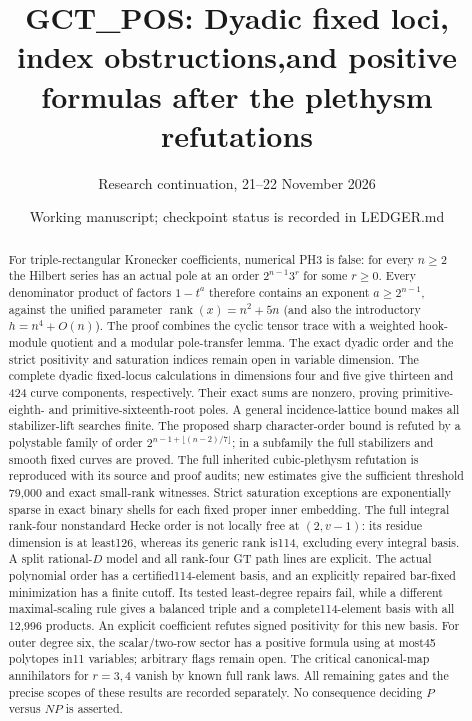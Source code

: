 \documentclass[11pt]{article}
\title{GCT\_POS: Dyadic fixed loci, index obstructions,\newline and positive formulas after the plethysm refutations}
\author{Research continuation, 21--22 November 2026}
\date{Working manuscript; checkpoint status is recorded in LEDGER.md}
\theoremstyle{definition}\newtheorem{definition}[theorem]{Definition}
\theoremstyle{remark}\newtheorem{remark}[theorem]{Remark}
\begin{document}
\maketitle
\begin{abstract}
For triple-rectangular Kronecker coefficients, numerical PH3 is false:
for every $n\ge2$ the Hilbert series has an actual pole at an order
$2^{n-1}3^r$ for some $r\ge0$. Every denominator product of factors
$1-t^a$ therefore contains an exponent $a\ge2^{n-1}$, against the
unified parameter $\operatorname{rank}(x)=n^2+5n$ (and also the introductory $h=n^4+O(n)$). The proof combines the cyclic tensor
trace with a weighted hook-module quotient and a modular pole-transfer
lemma. The exact dyadic order and the strict positivity and saturation
indices remain open in variable dimension. The complete dyadic
fixed-locus calculations in dimensions four and five give thirteen
and 424 curve components, respectively. Their exact sums are nonzero,
proving primitive-eighth- and primitive-sixteenth-root poles.
A general incidence-lattice bound makes all stabilizer-lift searches
finite. The proposed sharp character-order bound is refuted by a
polystable family of order $2^{n-1+\lfloor(n-2)/7\rfloor}$;
in a subfamily the full stabilizers and smooth fixed curves are proved.
The full inherited cubic-plethysm refutation is reproduced with its
source and proof audits; new estimates give the sufficient threshold
79,000 and exact small-rank witnesses. Strict saturation exceptions
are exponentially sparse in exact binary shells for each fixed proper
inner embedding. The full integral rank-four nonstandard Hecke order
is not locally free at $(2,v-1)$: its residue dimension is at least126,
whereas its generic rank is114, excluding every integral basis.
A split rational-$D$ model and all rank-four GT path lines are explicit.
The actual polynomial order has a certified114-element basis,
and an explicitly repaired bar-fixed minimization has a finite cutoff.
Its tested least-degree repairs fail, while a different maximal-scaling
rule gives a balanced triple and a complete114-element basis with all
12,996 products. An explicit coefficient refutes signed positivity
for this new basis.
For outer degree six, the scalar/two-row sector has a positive
formula using at most45 polytopes in11 variables; arbitrary flags
remain open.
The critical canonical-map annihilators for $r=3,4$ vanish by known
full rank laws. All remaining gates and the precise scopes of these
results are recorded separately. No consequence deciding $P$ versus
$NP$ is asserted.
\end{abstract}
\tableofcontents
\end{document}
